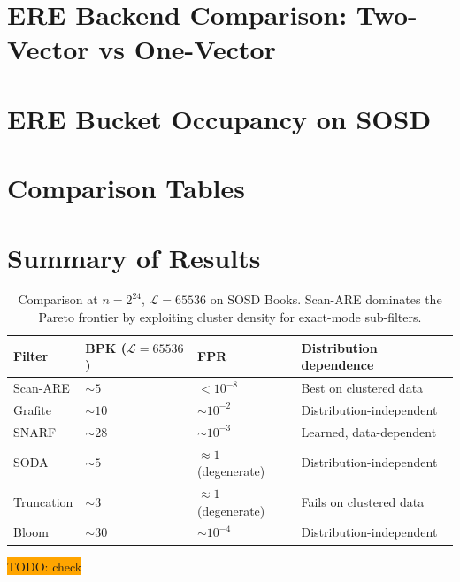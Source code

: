 \section{ERE Backend Comparison: Two-Vector vs One-Vector}
\label{sec:eval-ere-backend}



\section{ERE Bucket Occupancy on SOSD}
\label{sec:eval-bucket-occupancy}



%

\FloatBarrier


\section{Comparison Tables}
\label{sec:eval-tables}



\section{Summary of Results}

\begin{table}[H]
    \centering
    \begin{tabular}{@{}llll@{}}
        \toprule
        Filter     & BPK ($\mathcal{L}{=}65536$) & FPR                      & Distribution dependence  \\
        \midrule
        Scan-ARE   & ${\sim}5$                   & $< 10^{-8}$              & Best on clustered data   \\
        Grafite    & ${\sim}10$                  & ${\sim}10^{-2}$          & Distribution-independent \\
        SNARF      & ${\sim}28$                  & ${\sim}10^{-3}$          & Learned, data-dependent  \\
        SODA       & ${\sim}5$                   & $\approx 1$ (degenerate) & Distribution-independent \\
        Truncation & ${\sim}3$                   & $\approx 1$ (degenerate) & Fails on clustered data  \\
        Bloom      & ${\sim}30$                  & ${\sim}10^{-4}$          & Distribution-independent \\
        \bottomrule
    \end{tabular}
    \caption{Comparison at $n = 2^{24}$, $\mathcal{L} = 65536$ on SOSD Books. Scan-ARE
    dominates the Pareto frontier by exploiting cluster density for exact-mode sub-filters.}
    \label{tab:comparison}
\end{table}
\colorbox{orange}{TODO: check}
